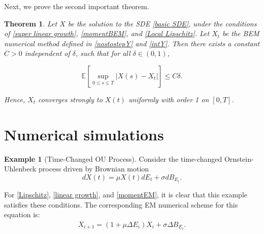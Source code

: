 \documentclass[10pt,reqno,final]{amsart}
\theoremstyle{plain}
\newtheorem{theorem}{Theorem}[section]
\theoremstyle{definition}
\newtheorem{example}{Example}
\theoremstyle{remark}
\numberwithin{equation}{section}
\numberwithin{figure}{section}
\numberwithin{table}{section}
\begin{document}
Next, we prove the second important theorem.
\begin{theorem}\label{main th BEM1}
	Let $X$ be the solution to the SDE \textnormal{\cref{basic SDE}}, under the conditions of \textnormal{\cref{super linear growth}}, \textnormal{\cref{momentBEM}}, and \textnormal{\cref{Local Lipschitz}}. 
	Let $X_t$ be the BEM numerical method defined in \textnormal{\cref{nostostepY}} and \textnormal{\cref{intY}}. Then there exists a constant $C > 0$ independent of $\delta$, such that for all $\delta \in (0,1)$,
	
	
	\[
	\mathbb{E} \left[ \sup_{0 \leq s \leq T} | X(s) - X_t | \right] \leq C \delta.
	\]
	
	
	Hence, $X_t$ converges strongly to $X(t)$ uniformly with order 1 on $[0, T]$.
\end{theorem}




\section{Numerical simulations}


\begin{example}[Time-Changed OU Process]
	Consider the time-changed Ornstein-Uhlenbeck process driven by Brownian motion
	\begin{equation}\label{linear}
		dX(t) = \mu X(t) dE_t + \sigma dB_{E_t}.
	\end{equation}
\end{example}
For \cref{Lipschitz}, \cref{linear growth}, and \cref{momentEM}, it is clear that this example satisfies these conditions. The corresponding EM numerical scheme for this equation is:
\begin{align*}
	X_{i+1} = (1 + \mu \Delta E_i) X_i + \sigma \Delta B_{E_i}.
\end{align*}
\end{document}
